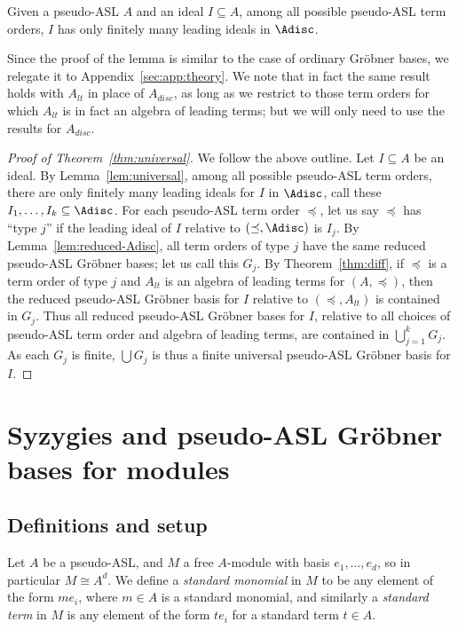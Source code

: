 \documentclass[11pt,reqno]{amsart}
\newcommand{\gb}{Gr\"{o}bner }
\theoremstyle{definition}
\numberwithin{equation}{section}
\begin{document}
\begin{lemma}[store=lemuniversal] \label{lem:universal}
Given a pseudo-ASL $A$ and an ideal $I \subseteq A$, among all possible pseudo-ASL term orders, $I$ has only finitely many leading ideals in $\Adisc$.
\end{lemma}

Since the proof of the lemma is similar to the case of ordinary Gröbner bases, we relegate it to Appendix~\ref{sec:app:theory}. We note that in fact the same result holds with $A_{lt}$ in place of $A_{disc}$, as long as we restrict to those term orders for which $A_{lt}$ is in fact an algebra of leading terms; but we will only need to use the results for $A_{disc}$.

\begin{proof}[Proof of Theorem~\ref{thm:universal}]
We follow the above outline. Let $I \subseteq A$ be an ideal. By Lemma~\ref{lem:universal}, among all possible pseudo-ASL term orders, there are only finitely many leading ideals for $I$ in $\Adisc$, call these $I_1, \dotsc, I_k \subseteq \Adisc$. For each pseudo-ASL term order $\preceq$, let us say $\preceq$ has ``type $j$'' if the leading ideal of $I$ relative to $(\preceq, \Adisc)$ is $I_j$. By Lemma~\ref{lem:reduced-Adisc}, all term orders of type $j$ have the same reduced pseudo-ASL Gröbner bases; let us call this $G_j$. By Theorem~\ref{thm:diff}, if $\preceq$ is a term order of type $j$ and $A_{lt}$ is an algebra of leading terms for $(A,\preceq)$, then the reduced pseudo-ASL Gröbner basis for $I$ relative to $(\preceq, A_{lt})$ is contained in $G_j$. Thus all reduced pseudo-ASL Gröbner bases for $I$, relative to all choices of pseudo-ASL term order and algebra of leading terms, are contained in $\bigcup_{j=1}^k G_j$. As each $G_j$ is finite, $\bigcup G_j$ is thus a finite universal pseudo-ASL Gröbner basis for $I$.
\end{proof}



\section{Syzygies and pseudo-ASL \gb bases for modules}
\label{sec:sygyzies}

\subsection{Definitions and setup}
Let $A$ be a pseudo-ASL, and $M$ a free $A$-module with basis $e_1, \dotsc, e_d$, so in particular $M \cong A^d$. We define a \emph{standard monomial} in $M$ to be any element of the form $m e_i$, where $m \in A$ is a standard monomial, and similarly a \emph{standard term} in $M$ is any element of the form $t e_i$ for a standard term $t \in A$. 
\end{document}
